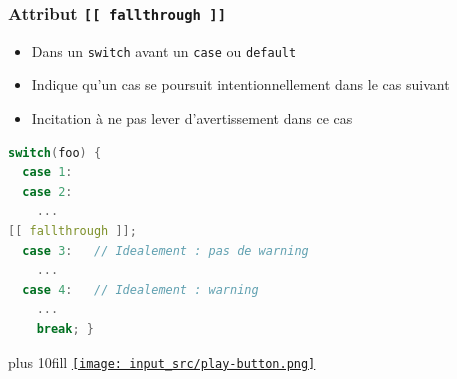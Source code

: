 \documentclass[C++.tex]{subfiles}
\begin{document}
\begin{frame}[fragile]
	\frametitle{Attribut \lstinline|[[ fallthrough ]]|}
	\begin{itemize}
		\item Dans un \lstinline|switch| avant un \lstinline|case| ou \lstinline|default|
		\item Indique qu'un cas se poursuit intentionnellement dans le cas suivant
		\item Incitation à ne pas lever d'avertissement dans ce cas
	\end{itemize}


	\begin{lstlisting}[language=C++]
switch(foo) {
  case 1:
  case 2:
    ...
[[ fallthrough ]];
  case 3:   // Idealement : pas de warning
    ...
  case 4:   // Idealement : warning
    ...
    break; }\end{lstlisting}


	\vskip 10mm plus 10fill
	\hfill
	\href{https://godbolt.org/#g:!((g:!((g:!((h:codeEditor,i:(filename:'1',fontScale:14,fontUsePx:'0',j:1,lang:c%2B%2B,selection:(endColumn:6,endLineNumber:12,positionColumn:6,positionLineNumber:12,selectionStartColumn:6,selectionStartLineNumber:12,startColumn:6,startLineNumber:12),source:'%23include+%3Ciostream%3E%0A%0Aint+main()%0A%7B%0A++int+foo+%3D+1%3B%0A%0A++switch(foo)%0A++%7B%0A++++case+1:%0A++++case+2:%0A++++++std::cout+%3C%3C+%22Cas+1-2%5Cn%22%3B%0A%23if+1%0A++++++%5B%5B+fallthrough+%5D%5D%3B%0A%23endif%0A%0A++++case+3:%0A++++++std::cout+%3C%3C+%22Cas+3%5Cn%22%3B%0A%0A++++case+4:%0A++++++std::cout+%3C%3C+%22Cas+4%5Cn%22%3B%0A++++++break%3B%0A%0A++++default:%0A++++++std::cout+%3C%3C+%22Cas+default%5Cn%22%3B%0A++++++break%3B%0A++%7D%0A%7D%0A'),l:'5',n:'0',o:'C%2B%2B+source+%231',t:'0')),k:50,l:'4',n:'0',o:'',s:0,t:'0'),(g:!((h:executor,i:(argsPanelShown:'1',compilationPanelShown:'0',compiler:g112,compilerOutShown:'0',execArgs:'',execStdin:'',fontScale:14,fontUsePx:'0',j:1,lang:c%2B%2B,libs:!((name:boost,ver:'175')),options:'-std%3Dc%2B%2B17+-Wall+-Wextra',source:1,stdinPanelShown:'1',tree:'1',wrap:'0'),l:'5',n:'0',o:'Executor+x86-64+gcc+11.2+(C%2B%2B,+Editor+%231)',t:'0')),header:(),k:50,l:'4',n:'0',o:'',s:0,t:'0')),l:'2',n:'0',o:'',t:'0')),version:4}{\texttt{[image: input\_src/play-button.png]}}
\end{frame}
\end{document}
